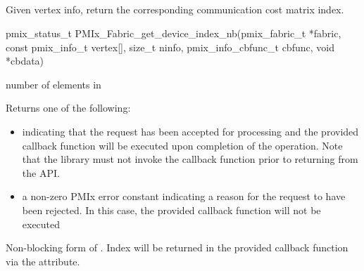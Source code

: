 \subsection{}

\summary

Given vertex info, return the corresponding communication cost matrix index.

\format

\cspecificstart
\begin{codepar}
pmix_status_t
PMIx_Fabric_get_device_index_nb(pmix_fabric_t *fabric,
                      const pmix_info_t vertex[], size_t ninfo,
                      pmix_info_cbfunc_t cbfunc, void *cbdata)
\end{codepar}
\cspecificend

\begin{arglist}
 number of elements in 
\end{arglist}

Returns one of the following:

\begin{itemize}
\item {} indicating that the request has been accepted for processing and the provided callback function will be executed upon completion of the operation. Note that the library must not invoke the callback function prior to returning from the \ac{API}.
\item a non-zero \ac{PMIx} error constant indicating a reason for the request to have been rejected. In this case, the provided callback function will not be executed
\end{itemize}


\descr

Non-blocking form of . Index will be returned in the provided callback function via the  attribute.

